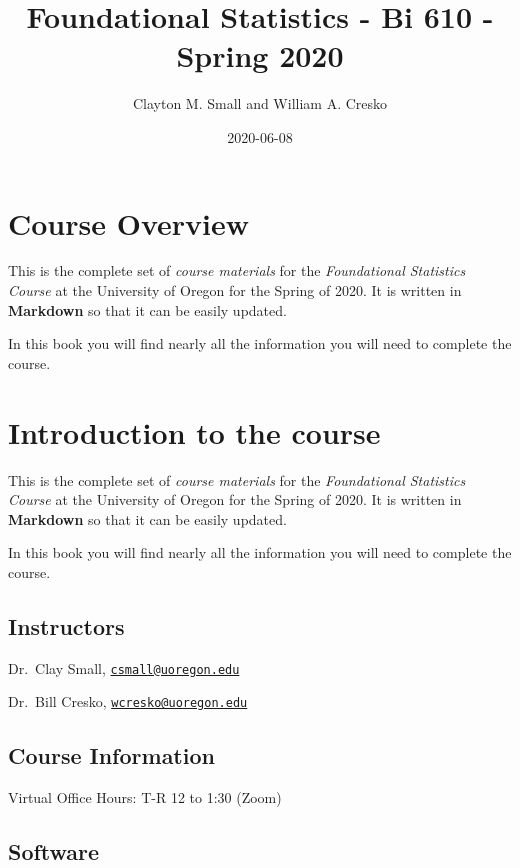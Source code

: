 \documentclass[]{book}
\title{Foundational Statistics - Bi 610 - Spring 2020}
\author{Clayton M. Small and William A. Cresko}
\date{2020-06-08}
\begin{document}
\maketitle

{
\setcounter{tocdepth}{1}
\tableofcontents
}
\hypertarget{course-overview}{%
\chapter{Course Overview}\label{course-overview}}

This is the complete set of \emph{course materials} for the \emph{Foundational Statistics Course} at the University of Oregon for the Spring of 2020. It is written in \textbf{Markdown} so that it can be easily updated.

In this book you will find nearly all the information you will need to complete the course.

\hypertarget{introduction-to-the-course}{%
\chapter{Introduction to the course}\label{introduction-to-the-course}}

This is the complete set of \emph{course materials} for the \emph{Foundational Statistics Course} at the University of Oregon for the Spring of 2020. It is written in \textbf{Markdown} so that it can be easily updated.

In this book you will find nearly all the information you will need to complete the course.

\hypertarget{instructors}{%
\section{Instructors}\label{instructors}}

Dr.~Clay Small, \href{mailto:csmall@uoregon.edu}{\nolinkurl{csmall@uoregon.edu}}

Dr.~Bill Cresko, \href{mailto:wcresko@uoregon.edu}{\nolinkurl{wcresko@uoregon.edu}}

\hypertarget{course-information}{%
\section{Course Information}\label{course-information}}

Virtual Office Hours: T-R 12 to 1:30 (Zoom)

\hypertarget{software}{%
\section{Software}\label{software}}
\end{document}
